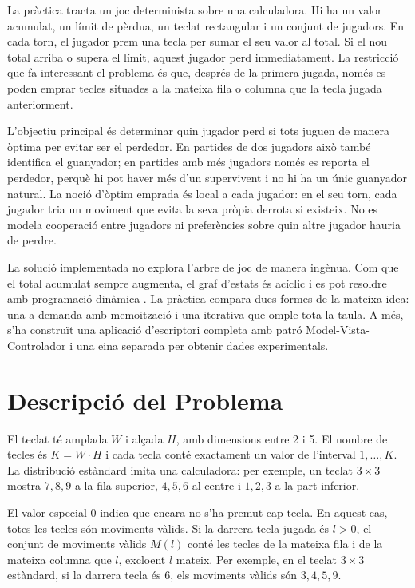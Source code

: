 \documentclass[conference,compsoc]{IEEEtran}
\begin{document}
La pràctica tracta un joc determinista sobre una calculadora. Hi ha un valor
acumulat, un límit de pèrdua, un teclat rectangular i un conjunt de jugadors.
En cada torn, el jugador prem una tecla per sumar el seu valor al total. Si el
nou total arriba o supera el límit, aquest jugador perd immediatament. La
restricció que fa interessant el problema és que, després de la primera jugada,
només es poden emprar tecles situades a la mateixa fila o columna que la tecla
jugada anteriorment.

L'objectiu principal és determinar quin jugador perd si tots juguen de manera
òptima per evitar ser el perdedor. En partides de dos jugadors això també
identifica el guanyador; en partides amb més jugadors només es reporta el
perdedor, perquè hi pot haver més d'un supervivent i no hi ha un únic guanyador
natural. La noció d'òptim emprada és local a cada jugador: en el seu torn, cada
jugador tria un moviment que evita la seva pròpia derrota si existeix. No es
modela cooperació entre jugadors ni preferències sobre quin altre jugador hauria
de perdre.

La solució implementada no explora l'arbre de joc de manera ingènua. Com que el
total acumulat sempre augmenta, el graf d'estats és acíclic i es pot resoldre
amb programació dinàmica \cite{ref_gfg_dp}. La pràctica compara dues formes de
la mateixa idea: una a demanda amb memoització i una iterativa que omple tota la
taula. A més, s'ha construït una aplicació d'escriptori completa amb patró
Model-Vista-Controlador i una eina separada per obtenir dades experimentals.

\section{Descripció del Problema}

El teclat té amplada $W$ i alçada $H$, amb dimensions entre 2 i 5. El nombre de
tecles és $K = W \cdot H$ i cada tecla conté exactament un valor de l'interval
$1,\ldots,K$. La distribució estàndard imita una calculadora: per exemple, un
teclat $3\times3$ mostra $7,8,9$ a la fila superior, $4,5,6$ al centre i
$1,2,3$ a la part inferior.

El valor especial $0$ indica que encara no s'ha premut cap tecla. En aquest cas,
totes les tecles són moviments vàlids. Si la darrera tecla jugada és $l>0$, el
conjunt de moviments vàlids $M(l)$ conté les tecles de la mateixa fila i de la
mateixa columna que $l$, excloent $l$ mateix. Per exemple, en el teclat
$3\times3$ estàndard, si la darrera tecla és $6$, els moviments vàlids són
$3,4,5,9$.
\end{document}
